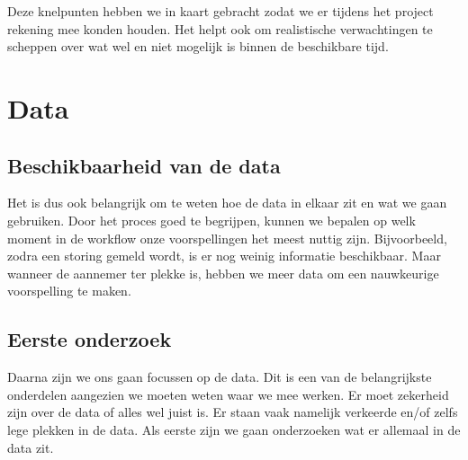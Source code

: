 \documentclass{article}
\begin{document}
Deze knelpunten hebben we in kaart gebracht zodat we er tijdens het project rekening mee konden houden. Het helpt ook om realistische verwachtingen te scheppen over wat wel en niet mogelijk is binnen de beschikbare tijd.

\newpage
\section{Data}

\subsection{Beschikbaarheid van de data}
Het is dus ook belangrijk om te weten hoe de data in elkaar zit en wat we gaan gebruiken. Door het proces goed te begrijpen, kunnen we bepalen op welk moment in de workflow onze voorspellingen het meest nuttig zijn. Bijvoorbeeld, zodra een storing gemeld wordt, is er nog weinig informatie beschikbaar. Maar wanneer de aannemer ter plekke is, hebben we meer data om een nauwkeurige voorspelling te maken.

\subsection{Eerste onderzoek}
Daarna zijn we ons gaan focussen op de data. Dit is een van de belangrijkste onderdelen aangezien we moeten weten waar we mee werken. Er moet zekerheid zijn over de data of alles wel juist is. Er staan vaak namelijk verkeerde en/of zelfs lege plekken in de data. Als eerste zijn we gaan onderzoeken wat er allemaal in de data zit.
\end{document}
